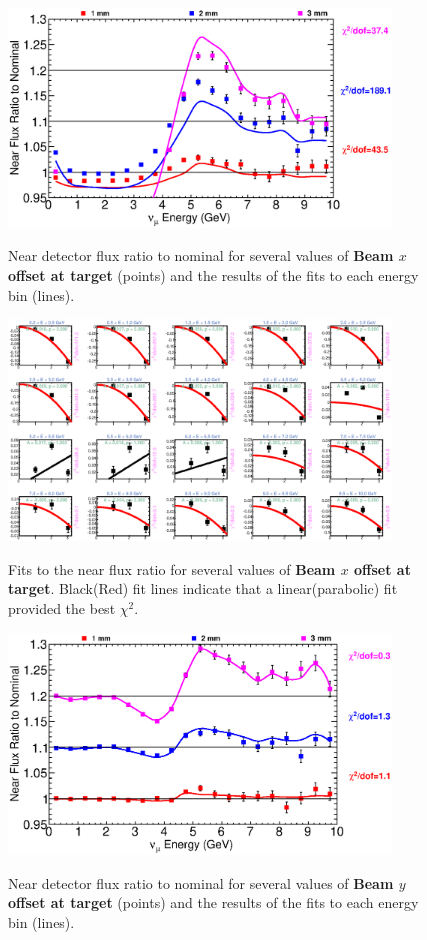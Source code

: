 \begin{figure}[ht]
  \begin{center}
    {\includegraphics[width=4.0in]{figures/NominalX_near_summary.eps}}
  \end{center}
\caption{ Near detector flux ratio to nominal for several values of {\bf Beam $x$ offset at target} (points) and the results of the fits to each energy bin (lines).}
\end{figure}

\begin{figure}[hb]
  \begin{center}
    {\includegraphics[width=4.0in]{figures/NominalX_near_fits.eps}}
  \end{center}
\caption{ Fits to the near flux ratio for several values of {\bf Beam $x$ offset at target}. Black(Red) fit lines indicate that a linear(parabolic) fit provided the best $\chi^2$. }
\end{figure}

\begin{figure}[ht]
  \begin{center}
    {\includegraphics[width=4.0in]{figures/NominalY_near_summary.eps}}
  \end{center}
\caption{ Near detector flux ratio to nominal for several values of {\bf Beam $y$ offset at target} (points) and the results of the fits to each energy bin (lines).}
\end{figure}

